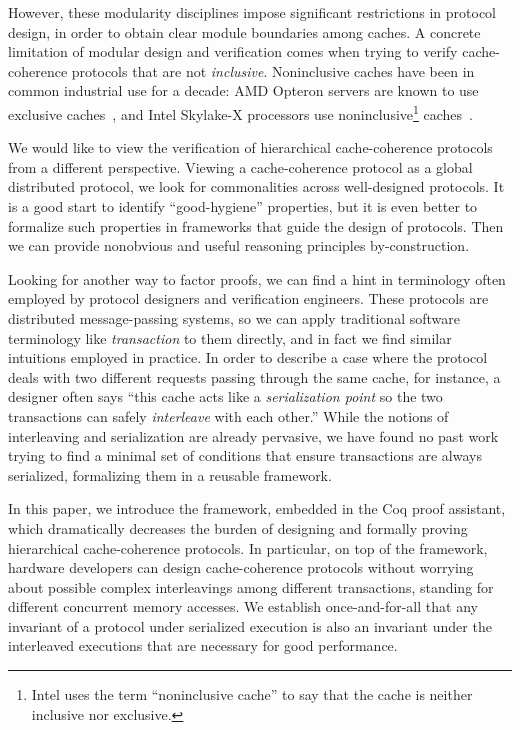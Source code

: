\documentclass[sigplan,10pt,review,anonymous,screen]{acmart}\settopmatter{printfolios=true,printccs=false,printacmref=false}
\begin{document}
However, these modularity disciplines impose significant restrictions in protocol design, in order to obtain clear module boundaries among caches.
A concrete limitation of modular design and verification comes when trying to verify cache-coherence protocols that are not \emph{inclusive}.
Noninclusive caches have been in common industrial use for a decade: AMD Opteron servers are known to use exclusive caches~\cite{Irazoqui:2016}, and Intel Skylake-X processors use noninclusive\footnote{Intel uses the term ``noninclusive cache'' to say that the cache is neither inclusive nor exclusive.} caches~\cite{intel-non-inclusive,Zhao:2010,Yan:2019}.

We would like to view the verification of hierarchical cache-coherence protocols from a different perspective.
Viewing a cache-coherence protocol as a global distributed protocol, we look for commonalities across well-designed protocols.
It is a good start to identify ``good-hygiene'' properties, but it is even better to formalize such properties in frameworks that guide the design of protocols.
Then we can provide nonobvious and useful reasoning principles by-construction.

Looking for another way to factor proofs, we can find a hint in terminology often employed by protocol designers and verification engineers.
These protocols are distributed message-passing systems, so we can apply traditional software terminology like \emph{transaction} to them directly, and in fact we find similar intuitions employed in practice.
In order to describe a case where the protocol deals with two different requests passing through the same cache, for instance, a designer often says ``this cache acts like a \emph{serialization point} so the two transactions can safely \emph{interleave} with each other.''
While the notions of interleaving and serialization are already pervasive, we have found no past work trying to find a minimal set of conditions that ensure transactions are always serialized, formalizing them in a reusable framework.

In this paper, we introduce the \hemiola{} framework, embedded in the Coq proof assistant, which dramatically decreases the burden of designing and formally proving hierarchical cache-coherence protocols.
In particular, on top of the framework, hardware developers can design cache-coherence protocols without worrying about possible complex interleavings among different transactions, standing for different concurrent memory accesses.
We establish once-and-for-all that any invariant of a protocol under serialized execution is also an invariant under the interleaved executions that are necessary for good performance.
\end{document}
